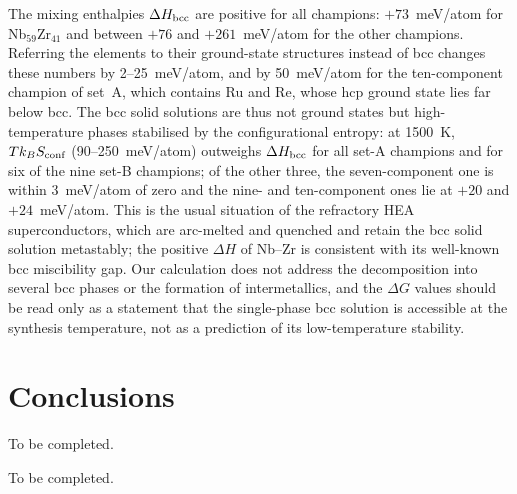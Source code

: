 \documentclass[aps,prb,reprint,superscriptaddress,twocolumn,floatfix]{revtex4-2}
\begin{document}
The mixing enthalpies $\Delta H_{\rm bcc}$ are positive for all champions: $+73$~meV/atom for
Nb$_{59}$Zr$_{41}$ and between $+76$ and $+261$~meV/atom for the other champions.
Referring the elements to their ground-state structures instead of bcc changes these
numbers by 2--25~meV/atom, and by 50~meV/atom for the ten-component champion of set~A, which
contains Ru and Re, whose hcp ground state lies far below bcc. The bcc solid solutions are thus not ground states but
high-temperature phases stabilised by the configurational entropy: at 1500~K, $T k_B S_{\rm
conf}$ (90--250~meV/atom) outweighs $\Delta H_{\rm bcc}$ for all set-A champions and for six
of the nine set-B champions; of the other three, the seven-component one is within
3~meV/atom of zero and the nine- and ten-component ones lie at $+20$ and $+24$~meV/atom. This is
the usual situation of the refractory HEA superconductors, which are arc-melted and quenched
and retain the bcc solid solution metastably; the positive $\Delta H$ of Nb--Zr is
consistent with its well-known bcc miscibility gap. Our calculation does not address
the decomposition into several bcc phases or the formation of intermetallics, and the
$\Delta G$ values should be read only as a statement that the single-phase bcc solution
is accessible at the synthesis temperature, not as a prediction of its low-temperature
stability.

\section{Conclusions}
\label{sec:conclusions}

To be completed.

\begin{acknowledgments}
To be completed.
\end{acknowledgments}


\end{document}
